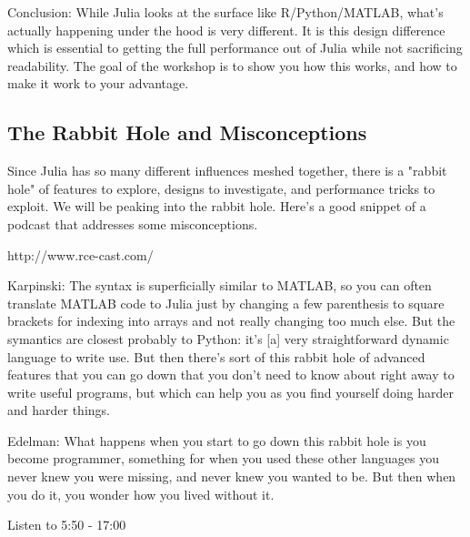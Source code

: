 \documentclass[11pt]{article}
\begin{document}
Conclusion: While Julia looks at the surface like R/Python/MATLAB,
what's actually happening under the hood is very different. It is this
design difference which is essential to getting the full performance out
of Julia while not sacrificing readability. The goal of the workshop is
to show you how this works, and how to make it work to your advantage.

    \subsection{The Rabbit Hole and
Misconceptions}\label{the-rabbit-hole-and-misconceptions}

Since Julia has so many different influences meshed together, there is a
"rabbit hole" of features to explore, designs to investigate, and
performance tricks to exploit. We will be peaking into the rabbit hole.
Here's a good snippet of a podcast that addresses some misconceptions.

http://www.rce-cast.com/

Karpinski: The syntax is superficially similar to MATLAB, so you can
often translate MATLAB code to Julia just by changing a few parenthesis
to square brackets for indexing into arrays and not really changing too
much else. But the symantics are closest probably to Python: it's
{[}a{]} very straightforward dynamic language to write use. But then
there's sort of this rabbit hole of advanced features that you can go
down that you don't need to know about right away to write useful
programs, but which can help you as you find yourself doing harder and
harder things.

Edelman: What happens when you start to go down this rabbit hole is you
become programmer, something for when you used these other languages you
never knew you were missing, and never knew you wanted to be. But then
when you do it, you wonder how you lived without it.

Listen to 5:50 - 17:00


    
    
    
    
\end{document}
